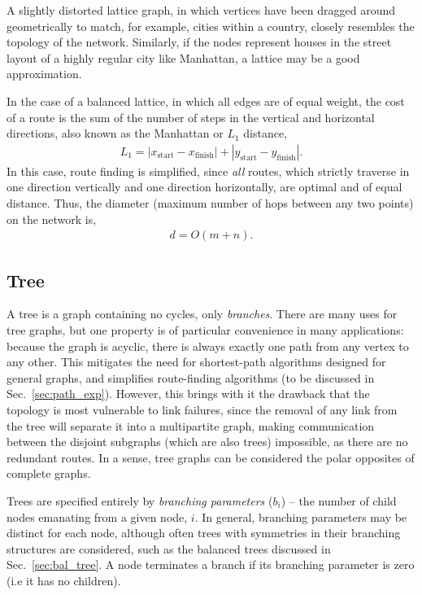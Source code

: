 A slightly distorted lattice graph, in which vertices have been dragged around geometrically to match, for example, cities within a country, closely resembles the topology of the network. Similarly, if the nodes represent houses in the street layout of a highly regular city like Manhattan, a lattice may be a good approximation.

In the case of a balanced lattice, in which all edges are of equal weight, the cost of a route is the sum of the number of steps in the vertical and horizontal directions, also known as the Manhattan or $L_1$ distance,
\begin{align}
L_1 = |x_\mathrm{start} - x_\mathrm{finish}| + |y_\mathrm{start} - y_\mathrm{finish}|.
\end{align}
In this case, route finding is simplified, since \textit{all} routes, which strictly traverse in one direction vertically and one direction horizontally, are optimal and of equal distance. Thus, the diameter (maximum number of hops between any two points) on the network is,
\begin{align}
	d=O(m+n).
\end{align}

%
%

\subsection{Tree}\label{sec:tree_topol} \label{sec:tree_graph} 

A tree is a graph containing no cycles, only \textit{branches}. There are many uses for tree graphs, but one property is of particular convenience in many applications: because the graph is acyclic, there is always exactly one path from any vertex to any other. This mitigates the need for shortest-path algorithms designed for general graphs, and simplifies route-finding algorithms (to be discussed in Sec.~\ref{sec:path_exp}). However, this brings with it the drawback that the topology is most vulnerable to link failures, since the removal of any link from the tree will separate it into a multipartite graph, making communication between the disjoint subgraphs (which are also trees) impossible, as there are no redundant routes. In a sense, tree graphs can be considered the polar opposites of complete graphs.

Trees are specified entirely by \textit{branching parameters} ($b_i$) -- the number of child nodes emanating from a given node, $i$. In general, branching parameters may be distinct for each node, although often trees with symmetries in their branching structures are considered, such as the balanced trees discussed in Sec.~\ref{sec:bal_tree}. A node terminates a branch if its branching parameter is zero (i.e it has no children).

